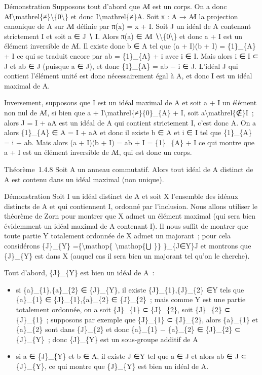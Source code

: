 \documentclass[]{article}
\begin{document}
Démonstration Supposons tout d'abord que A∕I est un corps. On a donc
A∕I\textbackslash{}mathrel\{≠\}\textbackslash{}\{0\textbackslash{}\} et
donc I\textbackslash{}mathrel\{≠\}A. Soit π : A → A∕I la projection
canonique de A sur A∕I définie par π(x) = x + I. Soit J un idéal de A
contenant strictement I et soit a ∈ J ∖ I. Alors π(a) ∈ A∕I
∖\textbackslash{}\{0\textbackslash{}\} et donc a + I est un élément
inversible de A∕I. Il existe donc b ∈ A tel que (a + I)(b + I) =
\{1\}\_\{A\} + I ce qui se traduit encore par ab = \{1\}\_\{A\} + i avec
i ∈ I. Mais alors i ∈ I ⊂ J et ab ∈ J (puisque a ∈ J), et donc
\{1\}\_\{A\} = ab − i ∈ J. L'idéal J qui contient l'élément unité est
donc nécessairement égal à A, et donc I est un idéal maximal de A.

Inversement, supposons que I est un idéal maximal de A et soit a + I un
élément non nul de A∕I, si bien que a +
I\textbackslash{}mathrel\{≠\}\{0\}\_\{A\} + I, soit
a\textbackslash{}mathrel\{∉\}I~; alors J = I + aA est un idéal de A qui
contient strictement I, c'est donc A. On a alors \{1\}\_\{A\} ∈ A = I +
aA et donc il existe b ∈ A et i ∈ I tel que \{1\}\_\{A\} = i + ab. Mais
alors (a + I)(b + I) = ab + I = \{1\}\_\{A\} + I ce qui montre que a + I
est un élément inversible de A∕I, qui est donc un corps.

Théorème~1.4.8 Soit A un anneau commutatif. Alors tout idéal de A
distinct de A est contenu dans un idéal maximal (non unique).

Démonstration Soit I un idéal distinct de A et soit X l'ensemble des
idéaux distincts de A et qui contiennent I, ordonné par l'inclusion.
Nous allons utiliser le théorème de Zorn pour montrer que X admet un
élément maximal (qui sera bien évidemment un idéal maximal de A
contenant I). Il nous suffit de montrer que toute partie Y totalement
ordonnée de X admet un majorant~; pour cela considérons \{J\}\_\{Y\}
=\{\textbackslash{}mathop\{ \textbackslash{}mathop\{⋃ \}\} \}\_\{J∈Y\}J
et montrons que \{J\}\_\{Y\} est dans X (auquel cas il sera bien un
majorant tel qu'on le cherche).

Tout d'abord, \{J\}\_\{Y\} est bien un idéal de A~:

\begin{itemize}
\itemsep1pt\parskip0pt
\item
  si \{a\}\_\{1\},\{a\}\_\{2\} ∈ \{J\}\_\{Y\}, il existe
  \{J\}\_\{1\},\{J\}\_\{2\} ∈Y tels que \{a\}\_\{1\} ∈
  \{J\}\_\{1\},\{a\}\_\{2\} ∈ \{J\}\_\{2\}~; mais comme Y est une partie
  totalement ordonnée, on a soit \{J\}\_\{1\} ⊂ \{J\}\_\{2\}, soit
  \{J\}\_\{2\} ⊂ \{J\}\_\{1\}~; supposons par exemple que \{J\}\_\{1\} ⊂
  \{J\}\_\{2\}, alors \{a\}\_\{1\} et \{a\}\_\{2\} sont dans
  \{J\}\_\{2\} et donc \{a\}\_\{1\} − \{a\}\_\{2\} ∈ \{J\}\_\{2\} ⊂
  \{J\}\_\{Y\}~; donc \{J\}\_\{Y\} est un sous-groupe additif de A
\item
  si a ∈ \{J\}\_\{Y\} et b ∈ A, il existe J ∈Y tel que a ∈ J et alors ab
  ∈ J ⊂ \{J\}\_\{Y\}, ce qui montre que \{J\}\_\{Y\} est bien un idéal
  de A.
\end{itemize}
\end{document}
